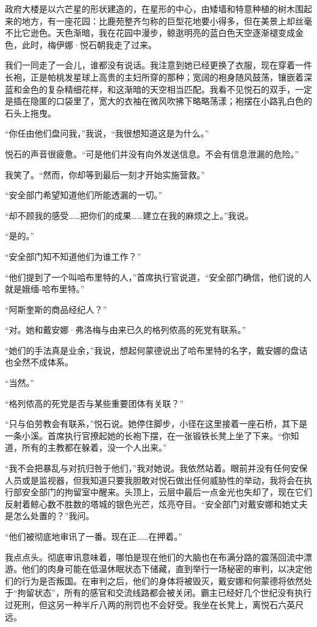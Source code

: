 \documentclass[AutoFakeBold=true]{book}
\begin{document}
\vspace*{1em}

政府大楼是以六芒星的形状建造的，在星形的中心，由矮墙和特意种植的树木围起来的地方，有一座花园：比鹿苑整齐匀称的巨型花地要小得多，但在美景上却丝毫不比它逊色。天色渐暗，我在花园中漫步，鲸逖明亮的蓝白色天空逐渐褪变成金色，此时，梅伊娜·悦石朝我走了过来。

我们一同走了一会儿，谁都没有说话。我注意到她已经更换了衣服，现在穿着一件长袍，正是帕桃发星球上高贵的主妇所穿的那种；宽阔的袍身随风鼓荡，镶嵌着深蓝和金色的复杂精细花样，和这渐暗的天空相当匹配。我看不见悦石的双手，一定是插在隐匿的口袋里了，宽大的衣袖在微风吹拂下略略荡漾；袍摆在小路乳白色的石头上拖曳。

``你任由他们盘问我，''我说，``我很想知道这是为什么。''

悦石的声音很疲惫。``可是他们并没有向外发送信息。不会有信息泄漏的危险。''

我笑了。``然而，你却等到最后一刻才开始实施营救。''

``安全部门希望知道他们所能透漏的一切。''

``却不顾我的感受……把你们的成果……建立在我的麻烦之上。''我说。

``是的。''

``安全部门知不知道他们为谁工作？''

``他们提到了一个叫哈布里特的人，''首席执行官说道，``安全部门确信，他们说的人就是娥缅-哈布里特。''

``阿斯奎斯的商品经纪人？''

``对。她和戴安娜·弗洛梅与由来已久的格列侬高的死党有联系。''

``她们的手法真是业余，''我说，想起何蒙德说出了哈布里特的名字，戴安娜的盘诘也全然不成体系。

``当然。''

``格列侬高的死党是否与某些重要团体有关联？''

``只与伯劳教会有联系，''悦石说。她停住脚步，小径在这里接着一座石桥，其下是一条小溪。首席执行官撩起她的长袍下摆，在一张锻铁长凳上坐了下来。``你知道，所有的主教都在躲着，没一个人出来。''

``我不会把暴乱与对抗归咎于他们，''我对她说。我依然站着。眼前并没有任何安保人员或是监视器，但我知道只要我胆敢对悦石做出任何威胁性的举动，我将会在执行部安全部门的拘留室中醒来。头顶上，云层中最后一点金光也失却了，现在它们反射着鲸心数不胜数的塔城的银色光芒，炫亮夺目。``安全部门对戴安娜和她丈夫是怎么处置的？''我问。

``他们被彻底地审讯了一番。现在正……在押着。''

我点点头。彻底审讯意味着，哪怕是现在他们的大脑也在布满分路的震荡回流中漂游。他们的肉身可能在低温休眠状态下储藏，直到举行一场秘密的审判，以决定他们的行为是否叛国。在审判之后，他们的身体将被毁灭，戴安娜和何蒙德将依然处于``拘留状态''，所有的感官和交流线路都会被关闭。霸主已经好几个世纪没有执行过死刑，但这另一种半斤八两的刑罚也不会好受。我坐在长凳上，离悦石六英尺远。
\end{document}
